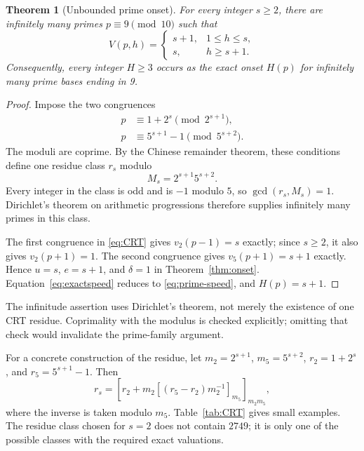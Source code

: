 \documentclass[11pt,letterpaper]{article}
\numberwithin{equation}{section}
\newtheorem{theorem}{Theorem}[section]
\theoremstyle{definition}
\theoremstyle{remark}
\newcommand{\res}[2]{\left[#1\right]_{#2}}
\begin{document}
\begin{theorem}[Unbounded prime onset]\label{thm:prime-family}
For every integer $s\ge2$, there are infinitely many primes $p\equiv9\pmod{10}$ such that
\begin{equation}\label{eq:prime-speed}
 V(p,h)=\begin{cases}
 s+1,&1\le h\le s,\\
 s,&h\ge s+1.
 \end{cases}
\end{equation}
Consequently, every integer $H\ge3$ occurs as the exact onset $H(p)$ for infinitely many prime bases ending in 9.
\end{theorem}
\begin{proof}
Impose the two congruences
\begin{equation}\label{eq:CRT}
 \begin{split}
 p&\equiv 1+2^s\pmod{2^{s+1}},\\
 p&\equiv 5^{s+1}-1\pmod{5^{s+2}}.
 \end{split}
\end{equation}
The moduli are coprime. By the Chinese remainder theorem, these conditions define one residue class $r_s$ modulo
\[
 M_s=2^{s+1}5^{s+2}.
\]
Every integer in the class is odd and is $-1$ modulo $5$, so $\gcd(r_s,M_s)=1$. Dirichlet's theorem on arithmetic progressions \cite{Dirichlet} therefore supplies infinitely many primes in this class.

The first congruence in \eqref{eq:CRT} gives $v_2(p-1)=s$ exactly; since $s\ge2$, it also gives $v_2(p+1)=1$. The second congruence gives $v_5(p+1)=s+1$ exactly. Hence $u=s$, $e=s+1$, and $\delta=1$ in Theorem~\ref{thm:onset}. Equation~\eqref{eq:exactspeed} reduces to \eqref{eq:prime-speed}, and $H(p)=s+1$.
\end{proof}

The infinitude assertion uses Dirichlet's theorem, not merely the existence of one CRT residue. Coprimality with the modulus is checked explicitly; omitting that check would invalidate the prime-family argument.

For a concrete construction of the residue, let $m_2=2^{s+1}$, $m_5=5^{s+2}$, $r_2=1+2^s$, and $r_5=5^{s+1}-1$. Then
\begin{equation}\label{eq:explicitCRT}
 r_s=\res{r_2+m_2\res{(r_5-r_2)m_2^{-1}}{m_5}}{m_2m_5},
\end{equation}
where the inverse is taken modulo $m_5$. Table~\ref{tab:CRT} gives small examples. The residue class chosen for $s=2$ does not contain $2749$; it is only one of the possible classes with the required exact valuations.
\end{document}
